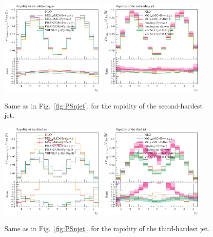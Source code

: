 \begin{figure}[hbt]
\centering
\includegraphics[width=0.47\textwidth]{figures/LOPS/y_j2.pdf}
\includegraphics[width=0.47\textwidth]{figures/NLOPS/y_j2.pdf}
\caption{Same as in Fig.~\protect\ref{fig:PSnjet}, for the rapidity of the second-hardest jet.}
\label{fig:PSy2}
\end{figure}

\begin{figure}[hbt]
\centering
\includegraphics[width=0.47\textwidth]{figures/LOPS/y_j3.pdf}
\includegraphics[width=0.47\textwidth]{figures/NLOPS/y_j3.pdf}
\caption{Same as in Fig.~\protect\ref{fig:PSnjet}, for the rapidity of the third-hardest jet.}
\label{fig:PSy3}
\end{figure}
 
